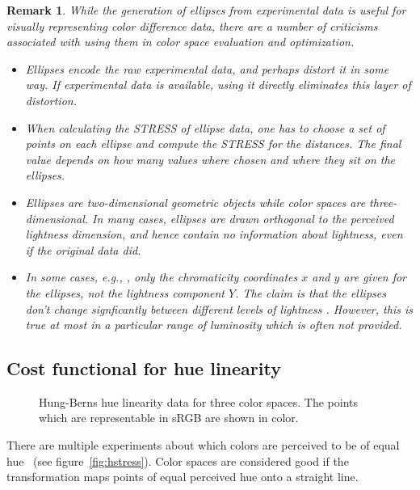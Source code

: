 \documentclass{scrartcl}
\newtheorem*{remark}{Remark}
\theoremstyle{named}
\begin{document}
\begin{remark}
  While the generation of ellipses from experimental data is useful for visually
  representing color difference data, there are a number of criticisms associated with
  using them in color space evaluation and optimization.
  \begin{itemize}
    \item Ellipses encode the raw experimental data, and perhaps distort it in some way.
      If experimental data is available, using it directly eliminates this layer of
      distortion.
    \item When calculating the STRESS of ellipse data, one has to choose a set of points
      on each ellipse and compute the STRESS for the distances. The final value depends
      on how many values where chosen and where they sit on the ellipses.
    \item Ellipses are two-dimensional geometric objects while color spaces are
      three-dimensional. In many cases, ellipses are drawn orthogonal to the perceived
      lightness dimension, and hence contain no information about lightness, even if the
      original data did.
    \item In some cases, e.g., \cite{macadam1942}, only the chromaticity coordinates $x$
      and $y$ are given for the ellipses, not the lightness component $Y$. The claim is
      that the ellipses don't change signficantly between different levels of lightness
      \cite{brown}. However, this is true at most in a particular range of luminosity
      which is often not provided.
    \end{itemize}
\end{remark}


\subsection{Cost functional for hue linearity}

\begin{figure}
  \centering
  
  \hfill
  
  \hfill
  
  \caption{Hung-Berns \cite{hung} hue linearity data for three color spaces. The points
  which are representable in sRGB are shown in color.}
\end{figure}

There are multiple experiments about which colors are perceived to be of equal
hue~\cite{hung,ebner,xiao} (see figure~\ref{fig:hstress}). Color spaces are considered
good if the transformation maps points of equal perceived hue onto a straight line.
\end{document}
